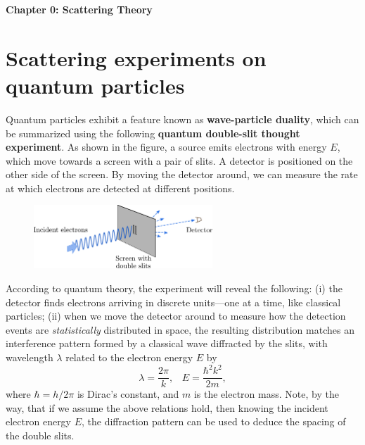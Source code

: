 \documentclass[pra,12pt]{revtex4}
\begin{document}
\begin{center}
{\Large \textbf{Chapter 0: Scattering Theory}}
\end{center}


\section{Scattering experiments on quantum particles}

Quantum particles exhibit a feature known as \textbf{wave-particle
  duality}, which can be summarized using the following
\textbf{quantum double-slit thought experiment}.  As shown in the
figure, a source emits electrons with energy $E$, which move towards a
screen with a pair of slits.  A detector is positioned on the other
side of the screen.  By moving the detector around, we can measure the
rate at which electrons are detected at different positions.

\begin{figure}[h]
  \centering\includegraphics[width=0.6\textwidth]{doubleslit}
\end{figure}

According to quantum theory, the experiment will reveal the following:
(i) the detector finds electrons arriving in discrete units---one at a
time, like classical particles; (ii) when we move the detector around
to measure how the detection events are \textit{statistically}
distributed in space, the resulting distribution matches an
interference pattern formed by a classical wave diffracted by the
slits, with wavelength $\lambda$ related to the electron energy $E$ by
\begin{equation}
  \lambda = \frac{2\pi}{k}, \;\;\; E = \frac{\hbar^2k^2}{2m},
\end{equation}
where $\hbar = h/2\pi$ is Dirac's constant, and $m$ is the electron
mass.  Note, by the way, that if we assume the above relations hold,
then knowing the incident electron energy $E$, the diffraction pattern
can be used to deduce the spacing of the double slits.
\end{document}
